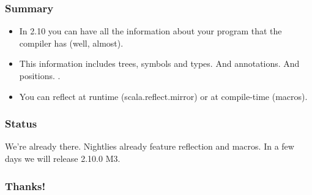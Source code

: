 \documentclass[hyperref={bookmarks=false}]{beamer}
\begin{document}
\begin{frame}[fragile]
\frametitle{Summary}

\begin{itemize}
\item In 2.10 you can have all the information about your program that the compiler has (well, almost).
\item This information includes trees, symbols and types. And annotations. And positions.
.
\item You can reflect at runtime (scala.reflect.mirror) or at compile-time (macros).
\end{itemize}
\end{frame}

\begin{frame}[fragile]
\frametitle{Status}

We're already there. Nightlies already feature reflection and macros.
In a few days we will release 2.10.0 M3.

\end{frame}


\begin{frame}[fragile]
\frametitle{Thanks!}

\centering
{}

\end{frame}
\end{document}
